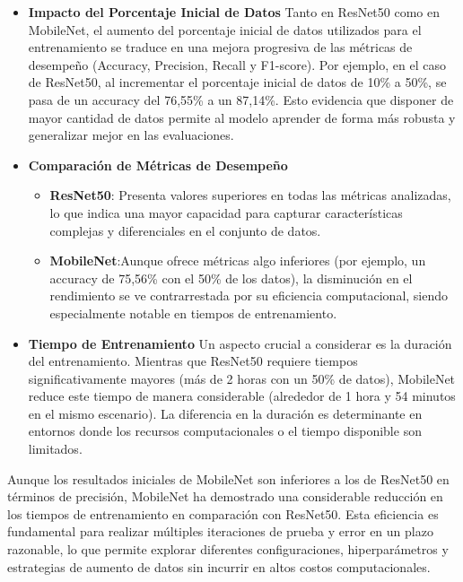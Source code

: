 \begin{itemize}
\item\textbf{Impacto del Porcentaje Inicial de Datos}
Tanto en ResNet50 como en MobileNet, el aumento del porcentaje inicial de datos utilizados para el entrenamiento se
traduce en una mejora progresiva de las métricas de desempeño (Accuracy, Precision, Recall y F1-score).
Por ejemplo, en el caso de ResNet50, al incrementar el porcentaje inicial de datos de 10\% a 50\%, se pasa de un
accuracy del 76,55\% a un 87,14\%.
Esto evidencia que disponer de mayor cantidad de datos permite al modelo aprender de forma más robusta y generalizar
mejor en las evaluaciones.


\item\textbf{Comparación de Métricas de Desempeño}
\begin{itemize}
    \item \textbf{ResNet50}: Presenta valores superiores en todas las métricas analizadas, lo que indica una mayor
    capacidad para capturar características complejas y diferenciales en el conjunto de datos.
    \item \textbf{MobileNet}:Aunque ofrece métricas algo inferiores (por ejemplo, un accuracy de 75,56\% con el 50\% de
    los datos), la disminución en el rendimiento se ve contrarrestada por su eficiencia computacional, siendo
    especialmente notable en tiempos de entrenamiento.
\end{itemize}

\item\textbf{Tiempo de Entrenamiento}
Un aspecto crucial a considerar es la duración del entrenamiento.
Mientras que ResNet50 requiere tiempos significativamente mayores (más de 2 horas con un 50\% de datos), MobileNet
reduce este tiempo de manera considerable (alrededor de 1 hora y 54 minutos en el mismo escenario).
La diferencia en la duración es determinante en entornos donde los recursos computacionales o el tiempo disponible son
limitados.
\end{itemize}

Aunque los resultados iniciales de MobileNet son inferiores a los de ResNet50 en términos de precisión, MobileNet ha
demostrado una considerable reducción en los tiempos de entrenamiento en comparación con ResNet50.
Esta eficiencia es fundamental para realizar múltiples iteraciones de prueba y error en un plazo razonable, lo que
permite explorar diferentes configuraciones, hiperparámetros y estrategias de aumento de datos sin incurrir en altos
costos computacionales.

